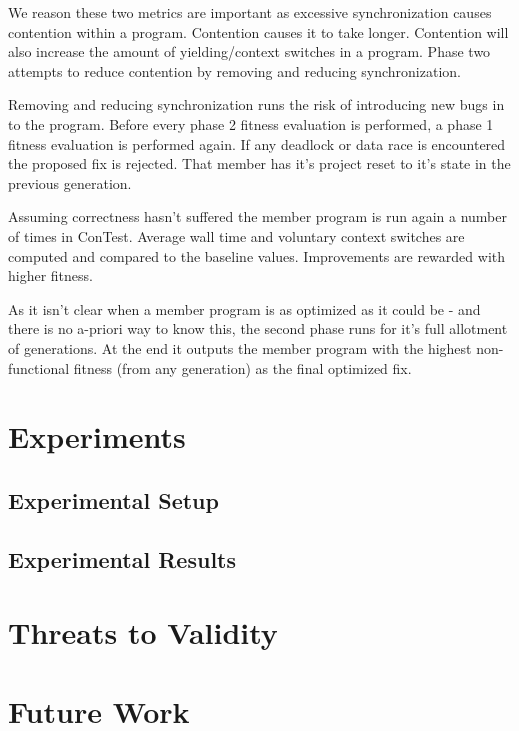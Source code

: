 \documentclass[10pt, conference, compsocconf]{IEEEtran}
\begin{document}
We reason these two metrics are important as excessive synchronization causes
contention within a program. Contention causes it to take longer. Contention
will also increase the amount of yielding/context switches in a program. Phase
two attempts to reduce contention by removing and reducing synchronization.

Removing and reducing synchronization runs the risk of introducing new bugs in
to the program. Before every phase 2 fitness evaluation is performed, a phase 1
fitness evaluation is performed again.  If any deadlock or data race is
encountered the proposed fix is rejected.  That member has it's project reset
to it's state in the previous generation.

Assuming correctness hasn't suffered the member program is run again a number
of times in ConTest.  Average wall time and voluntary context switches are
computed and compared to the baseline values.  Improvements are rewarded with
higher fitness.

As it isn't clear when a member program is as optimized as it could be - and
there is no a-priori way to know this, the second phase runs for it's full
allotment of generations.  At the end it outputs the member program with the
highest non-functional fitness (from any generation) as the final optimized
fix.
 
\section{Experiments}




\subsection{Experimental Setup}




\subsection{Experimental Results}




\section{Threats to Validity}




\section{Future Work}
\end{document}
